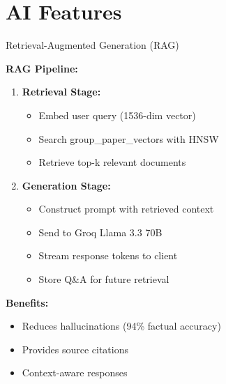 \documentclass{beamer}
\begin{document}
\section{AI Features}

\begin{frame}{Retrieval-Augmented Generation (RAG)}

\textbf{RAG Pipeline:}

\begin{enumerate}
    \item \textbf{Retrieval Stage:}
    \begin{itemize}
        \item Embed user query (1536-dim vector)
        \item Search group\_paper\_vectors with HNSW
        \item Retrieve top-k relevant documents
    \end{itemize}
    
    \item \textbf{Generation Stage:}
    \begin{itemize}
        \item Construct prompt with retrieved context
        \item Send to Groq Llama 3.3 70B
        \item Stream response tokens to client
        \item Store Q\&A for future retrieval
    \end{itemize}
\end{enumerate}

\vspace{0.3cm}

\textbf{Benefits:}
\begin{itemize}
    \item Reduces hallucinations (94\% factual accuracy)
    \item Provides source citations
    \item Context-aware responses
\end{itemize}

\end{frame}
\end{document}
